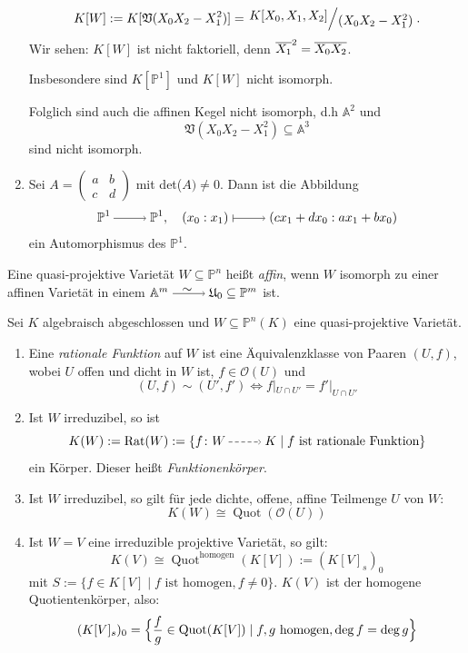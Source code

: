 \documentclass[a4paper,12pt,index=toc]{scrbook}
\theoremstyle{keinenummern} %
\def\A{\mathbb{A}}
\def\V{\mathfrak{V}}
\def\O{\mathcal{O}}
\def\P{\mathbb{P}}
\def\U{\mathfrak{U}}
\newcommand{\Rat}{\mathrm{Rat}}
\newcommand{\Quot}{\operatorname{Quot}}
\newcommand{\restrict}[1]{|_{#1}}
\def\Bar#1{\ensuremath\overline{#1}}
\begin{document}
\begin{bsp}
\begin{enumerate}
\[K[W]:=K[\V(X_0X_2-X_1^2)]=\Quotient{K[X_0,X_1,X_2]}{(X_0X_2-X_1^2)}.\]
Wir sehen: $K[W]$ ist nicht faktoriell, denn $\Bar{X_1}^2=\Bar{X_0}\Bar{X_2}$.

Insbesondere sind $K[\P^1]$ und $K[W]$ nicht isomorph.

Folglich sind auch die affinen Kegel nicht isomorph, d.h $\A^2$ und \[\V(X_0X_2-X_1^2)\subseteq \A^3\] sind nicht isomorph.
  \item{} Sei $A=\begin{pmatrix} a&b\\c&d \end{pmatrix}$ mit det($A)\neq 0$. Dann ist die Abbildung 
\[\P^1\ra \P^1, \quad (x_0:x_1)\mapsto (cx_1+dx_0:ax_1+bx_0)\]
ein Automorphismus des $\P^1$.
\end{enumerate}
\end{bsp}

\begin{dfn}\label{2.6.4}
Eine quasi-projektive Varietät $W\subseteq \P^n$ heißt \emph{affin}, wenn $W$ isomorph zu einer affinen Varietät in einem $\A^m \isom \U_0\subseteq \P^m$ ist.
\end{dfn}

\begin{db}\label{2.6.5}
 Sei $K$ algebraisch abgeschlossen und $W\subseteq \P^n(K)$ eine quasi-projektive Varietät.
\begin{enumerate}
  \item{} Eine \emph{rationale Funktion} auf $W$ ist eine Äquivalenzklasse von Paaren $(U,f)$, wobei $U$ offen und dicht in $W$ ist, $f\in \O(U)$ und
  \[(U,f)\sim (U',f') \iff f\restrict{U\cap U'}=f'\restrict{U\cap U'}\]
  \item{} Ist $W$ irreduzibel, so ist 
  \[K(W):=\Rat(W):=\{f\colon W \ppf K \mid f \text{ ist rationale Funktion}\}\]
  ein Körper. Dieser heißt \emph{Funktionenkörper}. 
  \item{} Ist $W$ irreduzibel, so gilt für jede dichte, offene, affine Teilmenge $U$ von $W$:
\[K(W)\cong \Quot(\O(U))\]
  \item{} Ist $W=V$ eine irreduzible projektive Varietät, so gilt:
\[K(V)\cong \Quot^{\mathrm{homogen}}(K[V]):=(K[V]_s)_0\] 
mit $S:=\{f\in K[V] \mid f \text{ ist homogen}, f\neq 0 \}$. $K(V)$ ist der homogene Quotientenkörper, also:
\[(K[V]_s)_0=\Bigl\{\frac{f}{g} \in \Quot(K[V]) \mid f,g \text{ homogen}, \deg f=\deg g\Bigr\}\]
\end{enumerate}
\end{db}
\end{document}
